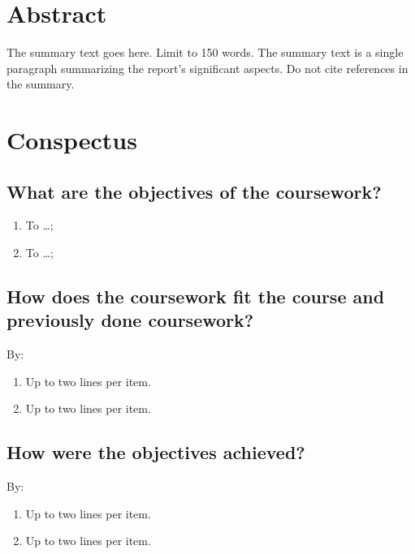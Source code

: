 \maketitle %






\section{Abstract}
The summary text goes here. Limit to 150 words. The summary text is a single paragraph summarizing the report's significant aspects. Do not cite references in the summary.


\section{Conspectus}
\label{sec:cnspcts}

\IEEEpubidadjcol %

\subsection{What are the objectives of the coursework?}

\begin{enumerate}
\item To \ldots;
\item To \ldots;
\end{enumerate}	
	
\subsection{How does the coursework fit the course and previously done coursework?}
By:
\begin{enumerate}
\item Up to two lines per item.
\item Up to two lines per item.
\end{enumerate}	


	
\subsection{How were the objectives achieved?}
By:
\begin{enumerate}
\item Up to two lines per item.
\item Up to two lines per item.
\end{enumerate}
	
